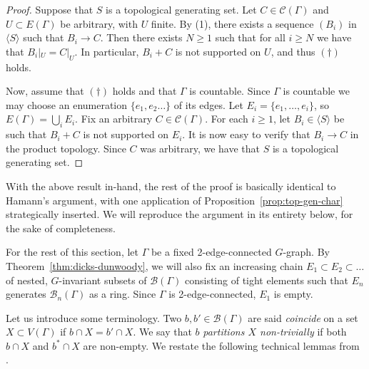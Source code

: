 \documentclass[11pt,a4paper]{amsart}
\theoremstyle{definition}
\newtheorem{remark}[theorem]{Remark}
\newcommand{\br}{{\mathscr{B}}}
\newcommand{\cyc}{\mathscr{C}}
\begin{document}
\begin{proof}
    Suppose that $S$ is a topological generating set. Let $C \in \cyc(\Gamma)$ and $U \subset E(\Gamma)$ be arbitrary, with $U$ finite. By (1), there exists a sequence $(B_i)$ in $\langle S \rangle$ such that $B_i \to C$. Then there exists $N \geq 1$ such that for all $i \geq N$ we have that $B_i |_U = C |_U$. In particular, $B_i + C$ is not supported on $U$, and thus $(\dagger)$ holds.

    Now, assume that $(\dagger)$ holds and that $\Gamma$ is countable. Since $\Gamma$ is countable we may choose an enumeration $\{e_1, e_2\ldots\}$ of its edges. Let $E_i = \{e_1, \ldots, e_i\}$, so $E(\Gamma) = \bigcup_iE_i$.  Fix an arbitrary $C \in \cyc(\Gamma)$. For each $i \geq 1$, let $B_i \in \langle S \rangle$ be such that $B_i + C$ is not supported on $E_i$. It is now easy to verify that $B_i \to C$ in the product topology. Since $C$ was arbitrary, we have that $S$ is a topological generating set.
\end{proof}




With the above result in-hand, the rest of the proof is basically identical to Hamann's argument, with one application of Proposition~\ref{prop:top-gen-char} strategically inserted. We will reproduce the argument in its entirety below, for the sake of completeness. 

For the rest of this section, let $\Gamma$ be a fixed 2-edge-connected $G$-graph. By Theorem~\ref{thm:dicks-dunwoody}, we will also fix an increasing chain 
    $
     E _1 \subset  E _2 \subset \ldots
    $
    of nested, $G$-invariant subsets of $\br (\Gamma)$ consisting of tight elements such that $ E _n$ generates $\br_n(\Gamma)$ as a ring. Since $\Gamma$ is 2-edge-connected, $ E _1$ is empty. 


Let us introduce some terminology. Two $b, b' \in \br(\Gamma)$ are said \textit{coincide} on a set $X \subset V(\Gamma)$ if $b \cap X = b' \cap X$. We say that $b$ \emph{partitions $X$ non-trivially} if both $b \cap X$ and $b^\ast \cap X$ are non-empty.
We restate the following technical lemmas from \cite{hamann2018accessibility}.
\end{document}

